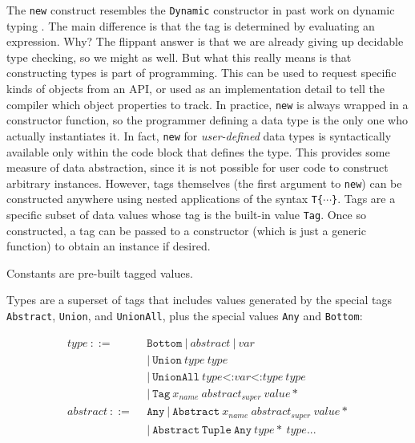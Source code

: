The \texttt{new} construct resembles the \texttt{Dynamic} constructor
in past work on dynamic typing \cite{Abadi:1991:DTS:103135.103138}.
The main difference is that the tag is determined by evaluating an
expression.
Why? The flippant answer is that we are already giving up decidable
type checking, so we might as well.
But what this really means is that constructing types is part of programming.
This can be used to request specific kinds of objects from an API, or
used as an implementation detail to tell the compiler which object
properties to track.
In practice, \texttt{new} is always wrapped in a constructor function, so
the programmer defining a data type is the only one who actually instantiates
it.
In fact, \texttt{new} for \emph{user-defined} data types is syntactically
available only within the code block that defines the type.
This provides some measure of data abstraction, since it is not possible
for user code to construct arbitrary instances.
However, tags themselves (the first argument to \texttt{new}) can be
constructed anywhere using nested applications of the syntax \texttt{T\{}$\cdots$\texttt{\}}.
Tags are a specific subset of data values whose tag is the built-in value
\texttt{Tag}.
Once so constructed, a tag can be passed to a constructor (which is just
a generic function) to obtain an instance if desired.

Constants are pre-built tagged values.

Types are a superset of tags that includes values generated by the
special tags \texttt{Abstract}, \texttt{Union}, and \texttt{UnionAll},
plus the special values \texttt{Any} and \texttt{Bottom}:

\vspace{-3ex}
\begin{singlespace}
\begin{align*}
  type\ ::=\ &\ \texttt{Bottom}\ |\ abstract\ |\ var \\
             &\ |\ \texttt{Union}\ type\ type \\
             &\ |\ \texttt{UnionAll}\ type\texttt{<:}var\texttt{<:}type\ type \\
             &\ |\ \texttt{Tag}\ x_{name}\ abstract_{super}\ value* \\
  abstract\ ::=\ &\ \texttt{Any}\ |\ \texttt{Abstract}\ x_{name}\ abstract_{super}\ value* \\
                 &\ |\ \texttt{Abstract}\ \texttt{Tuple}\ \texttt{Any}\ type*\ type\texttt{...}
\end{align*}
\end{singlespace}

